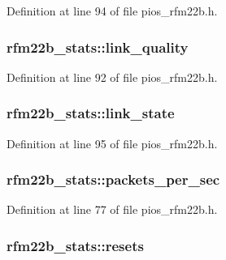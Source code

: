 Definition at line 94 of file pios\-\_\-rfm22b.\-h.

\hypertarget{structrfm22b__stats_a8d32fed579e3be2fbc354ab176670af2}{
\subsubsection[{link\-\_\-quality}]{ rfm22b\-\_\-stats\-::link\-\_\-quality}}\label{structrfm22b__stats_a8d32fed579e3be2fbc354ab176670af2}


Definition at line 92 of file pios\-\_\-rfm22b.\-h.

\hypertarget{structrfm22b__stats_aff1fd3341c07dab52a2a666cb6d7ddd4}{
\subsubsection[{link\-\_\-state}]{ rfm22b\-\_\-stats\-::link\-\_\-state}}\label{structrfm22b__stats_aff1fd3341c07dab52a2a666cb6d7ddd4}


Definition at line 95 of file pios\-\_\-rfm22b.\-h.

\hypertarget{structrfm22b__stats_a9ed3bba20847dcee3b0397c210b22d3d}{
\subsubsection[{packets\-\_\-per\-\_\-sec}]{ rfm22b\-\_\-stats\-::packets\-\_\-per\-\_\-sec}}\label{structrfm22b__stats_a9ed3bba20847dcee3b0397c210b22d3d}


Definition at line 77 of file pios\-\_\-rfm22b.\-h.

\hypertarget{structrfm22b__stats_a8d5014c62b137509e9a5a51fe9e1acae}{
\subsubsection[{resets}]{ rfm22b\-\_\-stats\-::resets}}\label{structrfm22b__stats_a8d5014c62b137509e9a5a51fe9e1acae}


